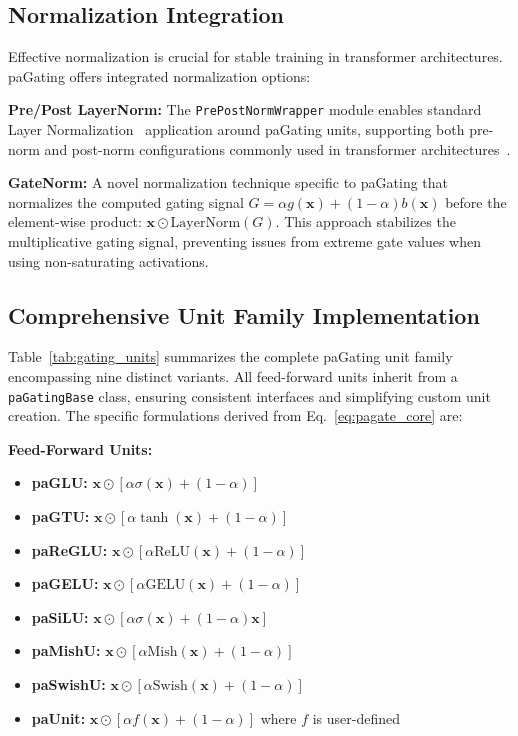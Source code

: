 \documentclass[lettersize,journal]{IEEEtran}
\begin{document}
\subsection{Normalization Integration}
Effective normalization is crucial for stable training in transformer architectures. paGating offers integrated normalization options:

\textbf{Pre/Post LayerNorm:} The \texttt{PrePostNormWrapper} module enables standard Layer Normalization~\cite{ba2016layer} application around paGating units, supporting both pre-norm and post-norm configurations commonly used in transformer architectures~\cite{vaswani2017attention,wang2019learning}.

\textbf{GateNorm:} A novel normalization technique specific to paGating that normalizes the computed gating signal $G = \alpha g(\mathbf{x}) + (1-\alpha)b(\mathbf{x})$ before the element-wise product: $\mathbf{x} \odot \text{LayerNorm}(G)$. This approach stabilizes the multiplicative gating signal, preventing issues from extreme gate values when using non-saturating activations.

\subsection{Comprehensive Unit Family Implementation}
Table~\ref{tab:gating_units} summarizes the complete paGating unit family encompassing nine distinct variants. All feed-forward units inherit from a \texttt{paGatingBase} class, ensuring consistent interfaces and simplifying custom unit creation. The specific formulations derived from Eq.~\eqref{eq:pagate_core} are:

\textbf{Feed-Forward Units:}
\begin{itemize}
\item \textbf{paGLU:} $\mathbf{x} \odot [\alpha\sigma(\mathbf{x}) + (1-\alpha)]$
\item \textbf{paGTU:} $\mathbf{x} \odot [\alpha\tanh(\mathbf{x}) + (1-\alpha)]$
\item \textbf{paReGLU:} $\mathbf{x} \odot [\alpha\text{ReLU}(\mathbf{x}) + (1-\alpha)]$
\item \textbf{paGELU:} $\mathbf{x} \odot [\alpha\text{GELU}(\mathbf{x}) + (1-\alpha)]$
\item \textbf{paSiLU:} $\mathbf{x} \odot [\alpha\sigma(\mathbf{x}) + (1-\alpha)\mathbf{x}]$
\item \textbf{paMishU:} $\mathbf{x} \odot [\alpha\text{Mish}(\mathbf{x}) + (1-\alpha)]$
\item \textbf{paSwishU:} $\mathbf{x} \odot [\alpha\text{Swish}(\mathbf{x}) + (1-\alpha)]$
\item \textbf{paUnit:} $\mathbf{x} \odot [\alpha f(\mathbf{x}) + (1-\alpha)]$ where $f$ is user-defined
\end{itemize}
\end{document}

